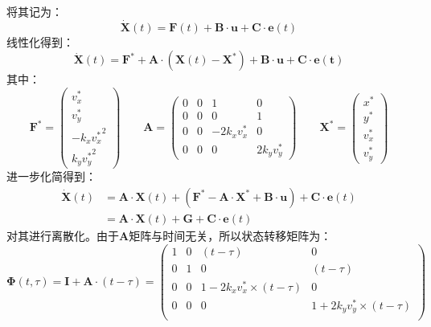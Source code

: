 \documentclass[12pt, onecolumn]{article}
\begin{document}
	将其记为：
	\begin{equation}
	\dot{\boldsymbol{X}}(t)=\boldsymbol{F}(t)+\boldsymbol{B}\cdot\boldsymbol{u}+\boldsymbol{C}\cdot\boldsymbol{e}(t)
	\end{equation}
	线性化得到：
	\begin{equation}
	\dot{\boldsymbol{X}}(t)=\boldsymbol{F^*}+\boldsymbol{A}\cdot\left( \boldsymbol{X}(t)-\boldsymbol{X^*}\right) +\boldsymbol{B}\cdot\boldsymbol{u}+\boldsymbol{C}\cdot\boldsymbol{e(t)}
	\end{equation}
	其中：
	\begin{equation}
	\boldsymbol{F^*}=\begin{pmatrix}
		v_x^*\\
		v_y^*\\
		-k_x {v^*_x}^2\\
		k_y {v^*_y}^2
		\end{pmatrix}
	\qquad
	\boldsymbol{A}=\begin{pmatrix}
		0&0&1&0\\
		0&0&0&1\\
		0&0&-2 k_x v_x^*&0\\
		0&0&0&2 k_y v_y^*
		\end{pmatrix}
		\qquad
		\boldsymbol{X^*}=\begin{pmatrix}
			x^*\\y^*\\v_x^*\\v_y^*
			\end{pmatrix}
	\end{equation}
	进一步化简得到：
	\begin{equation}
	\begin{aligned}
	\dot{\boldsymbol{X}}(t)&=\boldsymbol{A}\cdot\boldsymbol{X}(t)
		+\left( \boldsymbol{F^*}-\boldsymbol{A}\cdot\boldsymbol{X^*}+\boldsymbol{B}\cdot\boldsymbol{u}\right) 
		+\boldsymbol{C}\cdot\boldsymbol{e}(t)
		\\
		&=\boldsymbol{A}\cdot\boldsymbol{X}(t)
				+\boldsymbol{G}
				+\boldsymbol{C}\cdot\boldsymbol{e}(t)
	\end{aligned}
	\end{equation}
	对其进行离散化。由于$\boldsymbol{A}$矩阵与时间无关，所以状态转移矩阵为：
	\begin{equation}
	\boldsymbol{\Phi}(t,\tau)=\boldsymbol{I}+\boldsymbol{A}\cdot(t-\tau)=
	\begin{pmatrix}
	1&0&(t-\tau)&0\\
	0&1&0&(t-\tau)\\
	0&0&1-2 k_x v_x^*\times(t-\tau)&0\\
	0&0&0&1+2 k_y v_y^*\times(t-\tau)\\
	\end{pmatrix}
	\end{equation}
\end{document}
